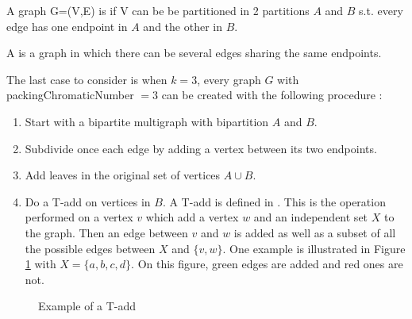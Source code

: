 \begin{mydef}
\label{def:bipartite}
A graph G=(V,E) is  if V can be be partitioned in 2 partitions $A$ and $B$ s.t. every edge has one endpoint in $A$ and the other in $B$.
\end{mydef}

\begin{mydef}
\label{def:multigraph}
A  is a graph in which there can be several edges sharing the same endpoints.
\end{mydef}

The last case to consider is when $k=3$, every graph $G$ with \gls{packingChromaticNumber} $=3$ can be created with the following procedure :

\begin{enumerate}
\item Start with a bipartite multigraph with bipartition $A$ and $B$.
\item Subdivide once each edge by adding a vertex between its two endpoints.
\item Add leaves in the original set of vertices $A \cup B$.
\item Do a T-add on vertices in $B$. A T-add is defined in \cite{broadcastchromatic}. This is the operation performed on a vertex $v$ which add a vertex $w$ and an independent set $X$ to the graph. Then an edge between $v$ and $w$ is added as well as a subset of all the possible edges between $X$ and $\{v,w\}$. One example is illustrated in Figure \ref{fig:Tadd} with $X=\{a,b,c,d\}$. On this figure, green edges are added and red ones are not.
\end{enumerate}



\begin{figure}
\centering
{}
\caption{Example of a T-add}
\label{fig:Tadd}
\end{figure}

